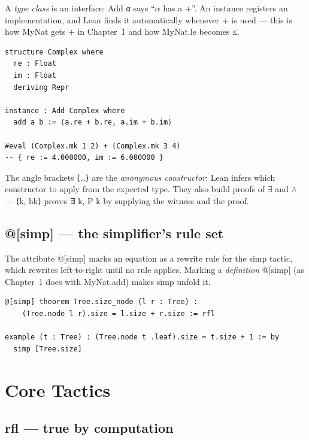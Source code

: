 \documentclass[12pt, openany]{book}
\theoremstyle{plain}
\theoremstyle{definition}
\theoremstyle{remark}
\newcommand{\li}[1]{{\ttfamily\small\color{tealaccent}#1}}
\begin{document}
A \emph{type class} is an interface: \li{Add α} says ``$\alpha$ has a \li{+}''.  An \li{instance} registers an implementation, and Lean finds it automatically whenever \li{+} is used --- this is how \li{MyNat} gets \li{+} in Chapter~1 and how \li{MyNat.le} becomes \li{≤}.

\begin{leanbox}
\begin{lstlisting}
structure Complex where
  re : Float
  im : Float
  deriving Repr

instance : Add Complex where
  add a b := ⟨a.re + b.re, a.im + b.im⟩

#eval (Complex.mk 1 2) + (Complex.mk 3 4)
-- { re := 4.000000, im := 6.000000 }
\end{lstlisting}
\end{leanbox}
\color{black}

The angle brackets \li{⟨\ldots⟩} are the \emph{anonymous constructor}: Lean infers which constructor to apply from the expected type.  They also build proofs of $\exists$ and $\land$ --- \li{⟨k, hk⟩} proves \li{∃ k, P k} by supplying the witness and the proof.

\subsection*{\li{@[simp]} --- the simplifier's rule set}

The attribute \li{@[simp]} marks an equation as a rewrite rule for the \li{simp} tactic, which rewrites left-to-right until no rule applies.  Marking a \emph{definition} \li{@[simp]} (as Chapter~1 does with \li{MyNat.add}) makes \li{simp} unfold it.

\begin{leanbox}
\begin{lstlisting}
@[simp] theorem Tree.size_node (l r : Tree) :
    (Tree.node l r).size = l.size + r.size := rfl

example (t : Tree) : (Tree.node t .leaf).size = t.size + 1 := by
  simp [Tree.size]
\end{lstlisting}
\end{leanbox}
\color{black}

\section{Core Tactics}

\subsection*{\li{rfl} --- true by computation}
\end{document}
